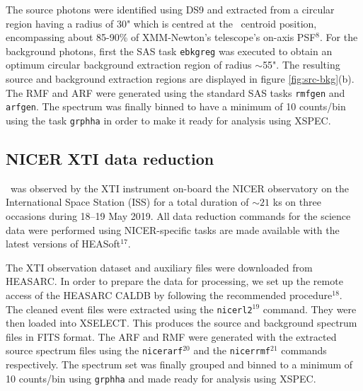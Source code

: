     	The source photons were identified using DS9 and extracted from a circular region having a radius of 30" which is centred at the \source\ centroid position, encompassing about 85-90\% of XMM-Newton's telescope's on-axis PSF$^8$. For the background photons, first the SAS task \texttt{ebkgreg} was executed to obtain an optimum circular background extraction region of radius $\sim$55". The resulting source and background extraction regions are displayed in figure \ref{fig:src-bkg}(b). The RMF and ARF were generated using the standard SAS tasks \texttt{rmfgen} and \texttt{arfgen}. The spectrum was finally binned to have a minimum of 10 counts/bin using the task \texttt{grphha} in order to make it ready for analysis using XSPEC.
    
    \subsection{NICER XTI data reduction}
    	\source\ was observed by the XTI instrument on-board the NICER observatory on the International Space Station (ISS) for a total duration of $\sim 21$ ks on three occasions during 18--19 May 2019. All data reduction commands for the science data were performed using NICER-specific tasks are made available with the latest versions of HEASoft$^{17}$.
    	
    	The XTI observation dataset and auxiliary files were downloaded from HEASARC. In order to prepare the data for processing, we set up the remote access of the HEASARC CALDB by following the recommended procedure$^{18}$. The cleaned event files were extracted using the \texttt{nicerl2}$^{19}$ command. They were then loaded into XSELECT. This produces the source and background spectrum files in FITS format. The ARF and RMF were generated with the extracted source spectrum files using the \texttt{nicerarf}$^{20}$ and the \texttt{nicerrmf}$^{21}$ commands respectively. The spectrum set was finally grouped and binned to a minimum of 10 counts/bin using \texttt{grphha} and made ready for analysis using XSPEC.